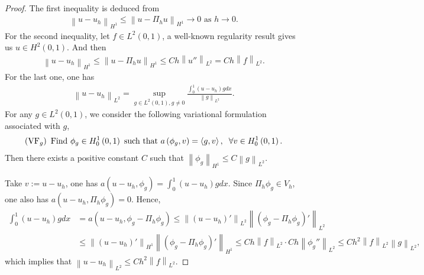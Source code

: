 \documentclass[11pt,a4paper,center,notitlepage]{article}
\numberwithin{equation}{section}
\begin{document}
\begin{proof}
The first inequality is deduced from 
\begin{align}
{\left\| {u - {u_h}} \right\|_{{H^1}}} \le {\left\| {u - {\Pi _h}u} \right\|_{{H^1}}} \to 0 \mbox{ as } h \to 0.
\end{align}
For the second inequality, let $f\in L^2\left(0,1\right)$, a well-known regularity result gives us $u\in H^2\left(0,1\right)$. And then
\begin{align}
{\left\| {u - {u_h}} \right\|_{{H^1}}} \le {\left\| {u - {\Pi _h}u} \right\|_{{H^1}}} \le Ch{\left\| {u''} \right\|_{{L^2}}} = Ch{\left\| f \right\|_{{L^2}}}.
\end{align}
For the last one, one has
\begin{align}
{\left\| {u - {u_h}} \right\|_{{L^2}}} = \mathop {\sup }\limits_{g \in {L^2}\left( {0,1} \right),g \ne 0} \frac{{\int_0^1 {\left( {u - {u_h}} \right)gdx} }}{{{{\left\| g \right\|}_{{L^2}}}}}.
\end{align}
For any $g\in L^2\left(0,1\right)$, we consider the following variational formulation associated with $g$,
\begin{align}
\left( {{\rm VF}_g} \right) \mbox{ Find } {\phi _g} \in H_0^1\left( {0,1} \right) \mbox{ such that } a\left( {{\phi _g},v} \right) = \left\langle {g,v} \right\rangle ,\hspace{2mm}\forall v \in H_0^1\left( {0,1} \right).
\end{align}
Then there exists a positive constant $C$ such that ${\left\| {{\phi _g}} \right\|_{{H^1}}} \le C{\left\| g \right\|_{{L^2}}}$. 

Take $v:=u-u_h$, one has $a\left( {u - {u_h},{\phi _g}} \right) = \int_0^1 {\left( {u - {u_h}} \right)gdx} $. Since ${\Pi _h}{\phi _g} \in {V_h}$, one also has $a\left( {u - {u_h},{\Pi _h}{\phi _g}} \right) = 0$. Hence,
\begin{align*}
\int_0^1 {\left( {u - {u_h}} \right)gdx}  &= a\left( {u - {u_h},{\phi _g} - {\Pi _h}{\phi _g}} \right) \le {\left\| {\left( {u - {u_h}} \right)'} \right\|_{{L^2}}}{\left\| {\left( {{\phi _g} - {\Pi _h}{\phi _g}} \right)'} \right\|_{{L^2}}}\\
& \le {\left\| {\left( {u - {u_h}} \right)'} \right\|_{{H^1}}}{\left\| {\left( {{\phi _g} - {\Pi _h}{\phi _g}} \right)'} \right\|_{{H^1}}} \le Ch{\left\| f \right\|_{{L^2}}} \cdot Ch{\left\| {{\phi _g}''} \right\|_{{L^2}}} \le C{h^2}{\left\| f \right\|_{{L^2}}}{\left\| g \right\|_{{L^2}}},
\end{align*}
which implies that ${\left\| {u - {u_h}} \right\|_{{L^2}}} \le C{h^2}{\left\| f \right\|_{{L^2}}}$. 
\end{proof}
\end{document}
